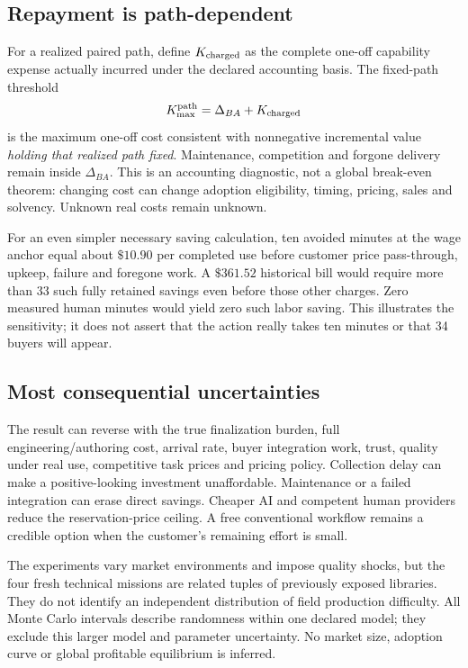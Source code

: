 \documentclass[11pt,a4paper]{article}
\newcommand{\money}[1]{\(\$#1\)}
\begin{document}
\subsection{Repayment is path-dependent}
For a realized paired path, define \(K_{\rm charged}\) as the complete one-off capability expense
actually incurred under the declared accounting basis. The fixed-path threshold
\begin{equation}
K_{\max}^{\rm path}=\Delta_{BA}+K_{\rm charged}
\label{eq:threshold}
\end{equation}
is the maximum one-off cost consistent with nonnegative incremental value \emph{holding that
realized path fixed}. Maintenance, competition and forgone delivery remain inside \(\Delta_{BA}\).
This is an accounting diagnostic, not a global break-even theorem: changing cost can change
adoption eligibility, timing, pricing, sales and solvency. Unknown real costs remain unknown.

For an even simpler necessary saving calculation, ten avoided minutes at the wage anchor equal
about \money{10.90} per completed use before customer price pass-through, upkeep, failure and
foregone work. A \money{361.52} historical bill would require more than 33 such fully retained
savings even before those other charges. Zero measured human minutes would yield zero such
labor saving. This illustrates the sensitivity; it does not assert that the action really takes
ten minutes or that 34 buyers will appear.

\subsection{Most consequential uncertainties}
The result can reverse with the true finalization burden, full engineering/authoring cost,
arrival rate, buyer integration work, trust, quality under real use, competitive task prices
and pricing policy. Collection delay can make a positive-looking investment unaffordable.
Maintenance or a failed integration can erase direct savings. Cheaper AI and competent human
providers reduce the reservation-price ceiling. A free conventional workflow remains a credible
option when the customer's remaining effort is small.

The experiments vary market environments and impose quality shocks, but the four fresh technical
missions are related tuples of previously exposed libraries. They do not identify an independent
distribution of field production difficulty. All Monte Carlo intervals describe randomness
within one declared model; they exclude this larger model and parameter uncertainty.
No market size, adoption curve or global profitable equilibrium is inferred.
\end{document}
